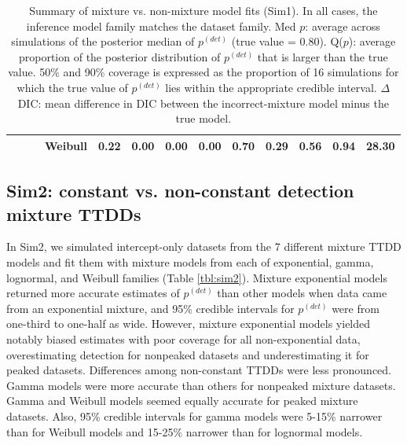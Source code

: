 \documentclass[useAMS,usenatbib,referee,12pt]{article}
\begin{document}
\begin{table}[ht]
\begin{tabular}{l|l|l|l|cccc|cccc||c}
 & & &   Weibull & 0.22 & 0.00 & 0.00 & 0.00 & 0.70 & 0.29 & 0.56 & 0.94 & 28.30 \\ 
   \hline
\end{tabular}
\caption{\label{tbl:sim1} Summary of mixture vs. non-mixture model fits (Sim1).  
In all cases, the inference model family matches the dataset family.  
Med $p$: average across simulations of the posterior median of $p^{(det)}$ (true value = 0.80).  
Q($p$): average proportion of the posterior distribution of $p^{(det)}$ that is larger than the true value.  
50\% and 90\% coverage is expressed as the proportion of 16 simulations for which the true value of $p^{(det)}$ lies within the appropriate credible interval.  
$\Delta$ DIC: mean difference in DIC between the incorrect-mixture model minus the true model.}
\end{table}





\subsection{Sim2: constant vs. non-constant detection mixture TTDDs}\label{sec:family}

In Sim2, we simulated intercept-only datasets from the 7 different mixture TTDD models and fit them with mixture models from each of exponential, gamma, lognormal, and Weibull families (Table \ref{tbl:sim2}).  
Mixture exponential models returned more accurate estimates of $p^{(det)}$ than other models when data came from an exponential mixture, and 95\% credible intervals for $p^{(det)}$ were from one-third to one-half as wide.  
However, mixture exponential models yielded notably biased estimates with poor coverage for all non-exponential data, overestimating detection for nonpeaked datasets and underestimating it for peaked datasets.  
Differences among non-constant TTDDs were less pronounced.  
Gamma models were more accurate than others for nonpeaked mixture datasets.  
Gamma and Weibull models seemed equally accurate for peaked mixture datasets.  
Also, 95\% credible intervals for gamma models were 5-15\% narrower than for Weibull models and 15-25\% narrower than for lognormal models.
\end{document}
